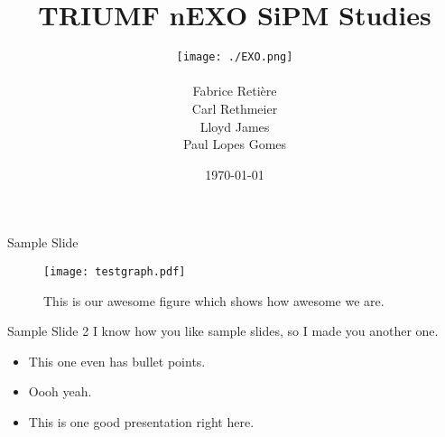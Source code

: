 \documentclass{beamer}
\title{TRIUMF nEXO SiPM Studies}
\author[]{\texttt{[image: ./EXO.png]}\\ \vspace{0.5cm} \\Fabrice Reti\`{e}re\\Carl Rethmeier\\Lloyd James\\Paul Lopes Gomes\vspace{-0.5cm}}
\institute[]{\texttt{[image: ./TRIUMF.png]}}
\date{\today}
\begin{document}
\begin{frame}
\maketitle
\end{frame}




\begin{frame}{Sample Slide}
\begin{figure}
\centering
\texttt{[image: testgraph.pdf]}
\caption{This is our awesome figure which shows how awesome we are.}
\end{figure}
\end{frame}

\begin{frame}{Sample Slide 2}
I know how you like sample slides, so I made you another one.\\
\begin{itemize}
\item This one even has bullet points.
\item Oooh yeah.
\item This is one good presentation right here.
\end{itemize}
\end{frame}
\end{document}
